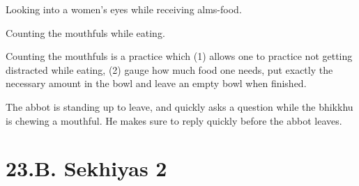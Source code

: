 \begin{exam}{\autoExamName}
\begin{problem*}
\begin{parts}
    \bigskip

    \item {} Looking into a women's eyes while receiving alms-food.

    \bigskip

    \item {} Counting the mouthfuls while eating.

    \begin{solution}
      Counting the mouthfuls is a practice which
      (1) allows one to practice not getting distracted while eating,
      (2) gauge how much food one needs, put exactly the necessary amount in the bowl
      and leave an empty bowl when finished.
    \end{solution}

    \bigskip

    \item {} The abbot is standing up to leave, and quickly asks a question
      while the bhikkhu is chewing a mouthful. He makes sure to reply quickly
      before the abbot leaves.

    \end{parts}

  \end{problem*}

\end{exam}

\chapter{23.B. Sekhiyas 2}
\renewcommand*{\theChapterTitle}{23.B. Sekhiyas 2}

